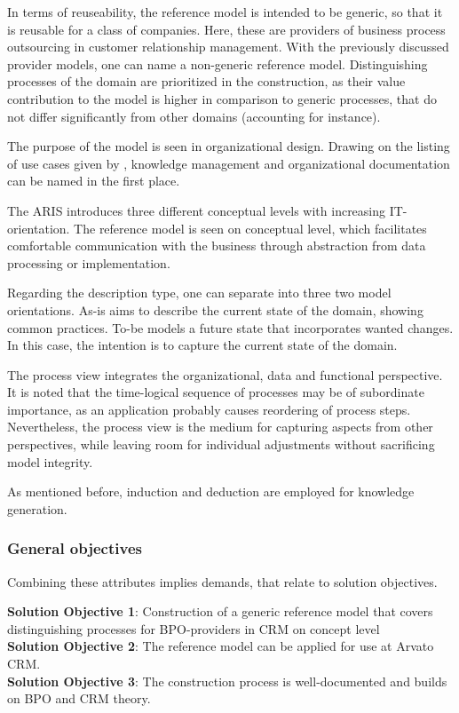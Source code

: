 In terms of reuseability, the reference model is intended to be generic, so that it is reusable for a class of companies. Here, these are providers of business process outsourcing in customer relationship management. With the previously discussed provider models, one can name a non-generic reference model. Distinguishing processes of the domain are prioritized in the construction, as their value contribution to the model is higher in comparison to generic processes, that do not differ significantly from other domains (accounting for instance).  

The purpose of the model is seen in organizational design. Drawing on the listing of use cases given by \citep[]{Rosemann2012proc}, knowledge management and organizational documentation can be named in the first place. 

The \acrshort{ARIS} introduces three different conceptual levels with increasing IT-orientation. The reference model is seen on conceptual level, which facilitates comfortable communication with the business through abstraction from data processing or implementation.

Regarding the description type, one can separate into three two model orientations. As-is aims to describe the current state of the domain, \viz showing common practices. To-be models a future state that incorporates wanted changes. In this case, the intention is to capture the current state of the domain. 

The process view integrates the organizational, data and functional perspective. It is noted that the time-logical sequence of processes may be of subordinate importance, as an application probably causes reordering of process steps. Nevertheless, the process view is the medium for capturing aspects from other perspectives, while leaving room for individual adjustments without sacrificing model integrity. 

As mentioned before, induction and deduction are employed for knowledge generation.
 
\subsubsection{General objectives}
Combining these attributes implies demands, that relate to solution objectives.

\hfill\begin{minipage}{\dimexpr\textwidth-1.2cm}
	\textbf{Solution Objective 1}: Construction of a generic  reference model that covers distinguishing processes for BPO-providers in CRM on concept level
	\\
	
	\textbf{Solution Objective 2}: The reference model can be applied for use at Arvato CRM.  
	\\
	
	\textbf{Solution Objective 3}: The construction process is well-documented and builds on \acrshort{BPO} and \acrshort{CRM} theory.
	
	\xdef\tpd{\the\prevdepth}
\end{minipage}


